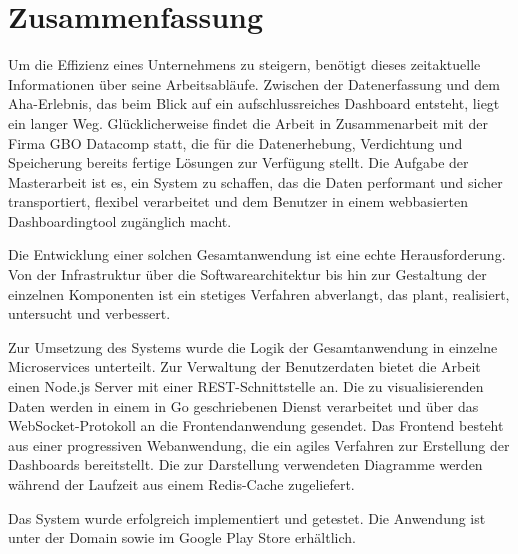 \chapter*{Zusammenfassung}
\label{chap:zusammenfassung}

Um die Effizienz eines Unternehmens zu steigern, benötigt dieses zeitaktuelle Informationen über seine Arbeitsabläufe.
Zwischen der Datenerfassung und dem Aha-Erlebnis, das beim Blick auf ein aufschlussreiches Dashboard entsteht, liegt ein
langer Weg. Glücklicherweise findet die Arbeit in Zusammenarbeit mit der Firma GBO Datacomp statt, die für die
Datenerhebung, Verdichtung und Speicherung bereits fertige Lösungen zur Verfügung stellt. Die Aufgabe der Masterarbeit
ist es, ein System zu schaffen, das die Daten performant und sicher transportiert, flexibel verarbeitet und dem Benutzer
in einem webbasierten Dashboardingtool zugänglich macht.

Die Entwicklung einer solchen Gesamtanwendung ist eine echte Herausforderung. Von der Infrastruktur
über die Softwarearchitektur bis hin zur Gestaltung der einzelnen Komponenten ist ein stetiges
Verfahren abverlangt, das plant, realisiert, untersucht und verbessert.

Zur Umsetzung des Systems wurde die Logik der Gesamtanwendung in einzelne Microservices
unterteilt. Zur Verwaltung der Benutzerdaten bietet die Arbeit einen Node.js Server
mit einer REST-Schnittstelle an. Die zu visualisierenden Daten werden in einem
in Go geschriebenen Dienst verarbeitet und über das WebSocket-Protokoll an die
Frontendanwendung gesendet. Das Frontend besteht aus einer progressiven Webanwendung,
die ein agiles Verfahren zur Erstellung der Dashboards bereitstellt. Die zur Darstellung
verwendeten Diagramme werden während der Laufzeit aus einem Redis-Cache zugeliefert.

Das System wurde erfolgreich implementiert und getestet. Die Anwendung ist unter der Domain 
sowie im Google Play Store erhältlich.
